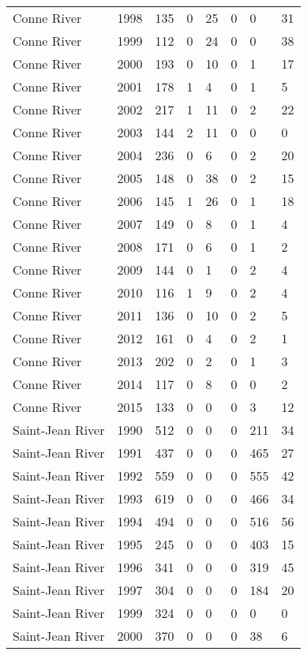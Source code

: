 \begin{longtable}{p{3cm}p{1cm}p{1.3cm}p{1.3cm}p{1.3cm}p{1.3cm}p{1.3cm}p{1.3cm}}
  Conne River & 1998 & 135 & 0 & 25 & 0 & 0 & 31 \\ 
  Conne River & 1999 & 112 & 0 & 24 & 0 & 0 & 38 \\ 
  Conne River & 2000 & 193 & 0 & 10 & 0 & 1 & 17 \\ 
  Conne River & 2001 & 178 & 1 & 4 & 0 & 1 & 5 \\ 
  Conne River & 2002 & 217 & 1 & 11 & 0 & 2 & 22 \\ 
  Conne River & 2003 & 144 & 2 & 11 & 0 & 0 & 0 \\ 
  Conne River & 2004 & 236 & 0 & 6 & 0 & 2 & 20 \\ 
  Conne River & 2005 & 148 & 0 & 38 & 0 & 2 & 15 \\ 
  Conne River & 2006 & 145 & 1 & 26 & 0 & 1 & 18 \\ 
  Conne River & 2007 & 149 & 0 & 8 & 0 & 1 & 4 \\ 
  Conne River & 2008 & 171 & 0 & 6 & 0 & 1 & 2 \\ 
  Conne River & 2009 & 144 & 0 & 1 & 0 & 2 & 4 \\ 
  Conne River & 2010 & 116 & 1 & 9 & 0 & 2 & 4 \\ 
  Conne River & 2011 & 136 & 0 & 10 & 0 & 2 & 5 \\ 
  Conne River & 2012 & 161 & 0 & 4 & 0 & 2 & 1 \\ 
  Conne River & 2013 & 202 & 0 & 2 & 0 & 1 & 3 \\ 
  Conne River & 2014 & 117 & 0 & 8 & 0 & 0 & 2 \\ 
  Conne River & 2015 & 133 & 0 & 0 & 0 & 3 & 12 \\ 
  Saint-Jean River & 1990 & 512 & 0 & 0 & 0 & 211 & 34 \\ 
  Saint-Jean River & 1991 & 437 & 0 & 0 & 0 & 465 & 27 \\ 
  Saint-Jean River & 1992 & 559 & 0 & 0 & 0 & 555 & 42 \\ 
  Saint-Jean River & 1993 & 619 & 0 & 0 & 0 & 466 & 34 \\ 
  Saint-Jean River & 1994 & 494 & 0 & 0 & 0 & 516 & 56 \\ 
  Saint-Jean River & 1995 & 245 & 0 & 0 & 0 & 403 & 15 \\ 
  Saint-Jean River & 1996 & 341 & 0 & 0 & 0 & 319 & 45 \\ 
  Saint-Jean River & 1997 & 304 & 0 & 0 & 0 & 184 & 20 \\ 
  Saint-Jean River & 1999 & 324 & 0 & 0 & 0 & 0 & 0 \\ 
  Saint-Jean River & 2000 & 370 & 0 & 0 & 0 & 38 & 6 \\ 

\end{longtable}
